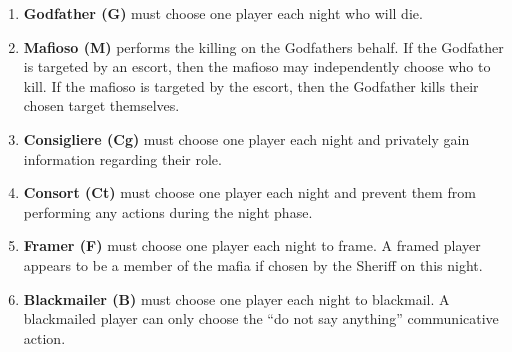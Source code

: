 \begin{enumerate}
	\item\textbf{Godfather (G)} must choose one player each night who will die.
	\item\textbf{Mafioso (M)} performs the killing on the Godfathers behalf. If
	      the
	      Godfather is targeted by an escort, then the mafioso may independently
	      choose who to kill. If the mafioso is targeted by the escort, then the
	      Godfather kills their chosen target themselves.
	\item\textbf{Consigliere (Cg)} must choose one player each night and
	      privately
	      gain information regarding their role.
	\item\textbf{Consort (Ct)} must choose one player each night and prevent
	      them
	      from performing any actions during the night phase.
	\item\textbf{Framer (F)} must choose one player each night to frame. A
	      framed
	      player appears to be a member of the mafia if chosen by the Sheriff on this
	      night.
	\item\textbf{Blackmailer (B)} must choose one player each night to
	      blackmail. A
	      blackmailed player can only choose the “do not say anything” communicative
	      action.
\end{enumerate}
